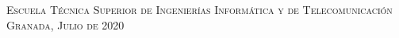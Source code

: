 \begin{titlepage}
\begin{minipage}{\textwidth}
\vspace{0.7cm}
\textsc{Escuela Técnica Superior de Ingenierías Informática y de Telecomunicación}\\
\vspace{1cm}
\textsc{Granada, Julio de 2020}
\end{minipage}
\end{titlepage}